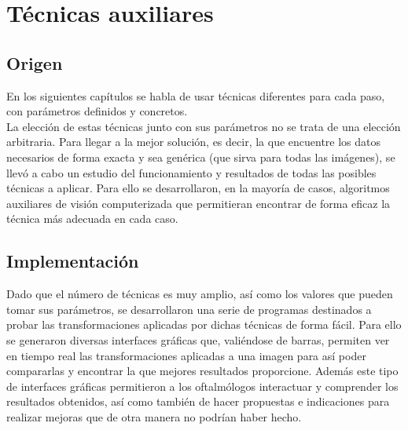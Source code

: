 \chapter{Técnicas auxiliares}
\section{Origen}
En los siguientes capítulos se habla de usar técnicas diferentes
para cada paso, con parámetros definidos y concretos. \\
La elección de estas técnicas junto con sus parámetros no se trata de
una elección arbitraria. Para llegar a la mejor solución, es decir, la
que encuentre los datos necesarios de forma exacta y sea genérica (que
sirva para todas las imágenes), se llevó a cabo un estudio del
funcionamiento y resultados de todas las posibles técnicas a aplicar.
Para ello se desarrollaron, en la mayoría de casos, algoritmos
auxiliares de visión computerizada que permitieran encontrar de forma
eficaz la técnica más adecuada en cada caso.

\section{Implementación}
Dado que el número de técnicas es muy amplio, así como los valores que
pueden tomar sus parámetros, se desarrollaron una serie de programas
destinados a probar las transformaciones aplicadas por dichas técnicas
de forma fácil. Para ello se generaron diversas interfaces gráficas
que, valiéndose de barras, permiten ver en tiempo real las
transformaciones aplicadas a una imagen para así poder compararlas y
encontrar la que mejores resultados proporcione. Además este tipo de
interfaces gráficas permitieron a los oftalmólogos interactuar y
comprender los resultados obtenidos, así como también de hacer
propuestas e indicaciones para realizar mejoras que de otra manera no
podrían haber hecho.
